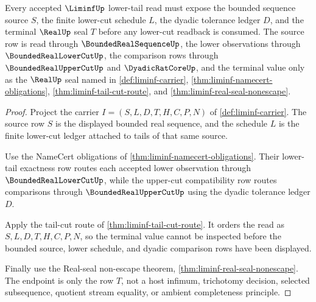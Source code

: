 \begin{theorem}
\label{thm:liminf-lower-cut-readback-scope}
Every accepted $\LiminfUp$ lower-tail read must expose the bounded sequence source $S$, the finite lower-cut schedule $L$, the dyadic tolerance ledger $D$, and the terminal $\RealUp$ seal $T$ before any lower-cut readback is consumed. The source row is read through $\BoundedRealSequenceUp$, the lower observations through $\BoundedRealLowerCutUp$, the comparison rows through $\BoundedRealUpperCutUp$ and $\DyadicRatCoreUp$, and the terminal value only as the $\RealUp$ seal named in \autoref{def:liminf-carrier}, \autoref{thm:liminf-namecert-obligations}, \autoref{thm:liminf-tail-cut-route}, and \autoref{thm:liminf-real-seal-nonescape}.
\end{theorem}
\begin{proof}
Project the carrier $I=(S,L,D,T,H,C,P,N)$ of \autoref{def:liminf-carrier}. The source row $S$ is the displayed bounded real sequence, and the schedule $L$ is the finite lower-cut ledger attached to tails of that same source.

Use the NameCert obligations of \autoref{thm:liminf-namecert-obligations}. Their lower-tail exactness row routes each accepted lower observation through $\BoundedRealLowerCutUp$, while the upper-cut compatibility row routes comparisons through $\BoundedRealUpperCutUp$ using the dyadic tolerance ledger $D$.

Apply the tail-cut route of \autoref{thm:liminf-tail-cut-route}. It orders the read as $S,L,D,T,H,C,P,N$, so the terminal value cannot be inspected before the bounded source, lower schedule, and dyadic comparison rows have been displayed.

Finally use the Real-seal non-escape theorem, \autoref{thm:liminf-real-seal-nonescape}. The endpoint is only the row $T$, not a host infimum, trichotomy decision, selected subsequence, quotient stream equality, or ambient completeness principle.
\end{proof}

